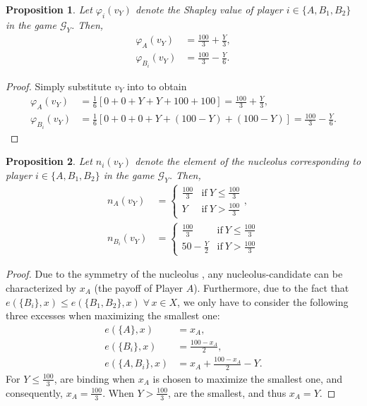 \documentclass[12pt]{article}
\newtheorem{proposition}{Proposition}
\begin{document}
\begin{proposition}
    \label{prop:shapley_value}
    Let $\varphi_i(v_Y)$ denote the Shapley value of player $i \in \{A, B_1, B_2\}$ in the game $\mathcal{G}_Y$. Then,
    \begin{align*}
        \varphi_A(v_Y) &= \frac{100}{3} + \frac{Y}{3}, \\
        \varphi_{B_i}(v_Y) &= \frac{100}{3} - \frac{Y}{6}.
    \end{align*}
\end{proposition}
\begin{proof}
    Simply substitute $v_Y$ into  to obtain
    \begin{align*}
        \varphi_A(v_Y) &= \frac{1}{6} \left[ 0+0+Y+Y+100+100 \right] = \frac{100}{3} + \frac{Y}{3}, \\
        \varphi_{B_i}(v_Y) &= \frac{1}{6} \left[ 0+0+0+Y+(100-Y)+(100-Y) \right] = \frac{100}{3} - \frac{Y}{6}.
    \end{align*}
\end{proof}

\begin{proposition}
    \label{prop:nucleolus}
    Let $n_i(v_Y)$ denote the element of the nucleolus corresponding to player $i \in \{A, B_1, B_2\}$ in the game $\mathcal{G}_Y$. Then,
    \begin{align*}
        n_A(v_Y) &= \begin{cases}
            \frac{100}{3} & \text{if}\ Y \leq \frac{100}{3} \\
            Y & \text{if}\ Y > \frac{100}{3}
        \end{cases}, \\
        n_{B_i}(v_Y) &= \begin{cases}
            \frac{100}{3} & \text{if}\ Y \leq \frac{100}{3} \\
            50 - \frac{Y}{2} & \text{if}\ Y > \frac{100}{3}
        \end{cases} 
    \end{align*}
\end{proposition}
\begin{proof}
    Due to the symmetry of the nucleolus \parencite{snijders1995axiomatization}, any nucleolus-candidate can be characterized by $x_A$ (the payoff of Player $A$). Furthermore, due to the fact that $e(\{B_i\}, x) \leq e(\{B_1, B_2\}, x) \;\forall\, x\in X$, we only have to consider the following three excesses when maximizing the smallest one:
    \begin{align}
        e(\{A\}, x) &= x_A, \label{eq:excess_A} \\
        e(\{B_i\}, x) &= \frac{100-x_A}{2}, \label{eq:excess_B} \\
        e(\{A, B_i\}, x) &= x_A + \frac{100-x_A}{2} - Y. \label{eq:excess_AB}
    \end{align}
    For $Y \leq \frac{100}{3}$,  are binding when $x_A$ is chosen to maximize the smallest one, and consequently, $x_A = \frac{100}{3}$. When $Y > \frac{100}{3}$,  are the smallest, and thus $x_A = Y$.
\end{proof}
\end{document}
